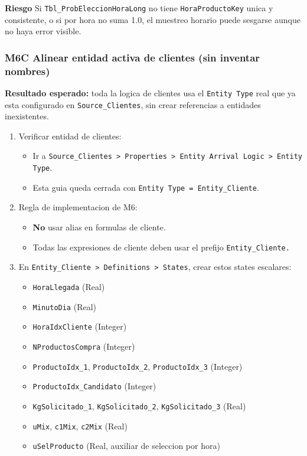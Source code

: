 \documentclass[11pt]{article}
\newcommand{\simio}[1]{\texttt{#1}}
\newcommand{\tabla}[1]{\texttt{#1}}
\newcommand{\state}[1]{\texttt{#1}}
\newcommand{\risk}{\textcolor{rojoriesgo}{\textbf{Riesgo}}}
\begin{document}
\risk{} Si \tabla{Tbl\_ProbEleccionHoraLong} no tiene \state{HoraProductoKey} unica y consistente, o si por hora no suma 1.0, el muestreo horario puede sesgarse aunque no haya error visible.

\subsubsection{M6C Alinear entidad activa de clientes (sin inventar nombres)}
\textbf{Resultado esperado:} toda la logica de clientes usa el \simio{Entity Type} real que ya esta configurado en \simio{Source\_Clientes}, sin crear referencias a entidades inexistentes.

\begin{enumerate}
  \item Verificar entidad de clientes:
  \begin{itemize}
    \item Ir a \simio{Source\_Clientes > Properties > Entity Arrival Logic > Entity Type}.
    \item Esta guia queda cerrada con \simio{Entity Type = Entity\_Cliente}.
  \end{itemize}
  \item Regla de implementacion de M6:
  \begin{itemize}
    \item \textbf{No} usar alias en formulas de cliente.
    \item Todas las expresiones de cliente deben usar el prefijo \state{Entity\_Cliente.}
  \end{itemize}
  \item En \simio{Entity\_Cliente > Definitions > States}, crear estos states escalares:
  \begin{itemize}
    \item \state{HoraLlegada} (Real)
    \item \state{MinutoDia} (Real)
    \item \state{HoraIdxCliente} (Integer)
    \item \state{NProductosCompra} (Integer)
    \item \state{ProductoIdx\_1}, \state{ProductoIdx\_2}, \state{ProductoIdx\_3} (Integer)
    \item \state{ProductoIdx\_Candidato} (Integer)
    \item \state{KgSolicitado\_1}, \state{KgSolicitado\_2}, \state{KgSolicitado\_3} (Real)
    \item \state{uMix}, \state{c1Mix}, \state{c2Mix} (Real)
    \item \state{uSelProducto} (Real, auxiliar de seleccion por hora)

\end{itemize}
\end{enumerate}
\end{document}
